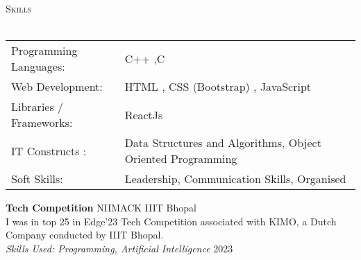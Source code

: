 \documentclass[a4paper]{article}
\newcommand{\lineunder} {
    \vspace*{-8pt} \\
    \hspace*{-18pt} \hrulefill \\
}
\newcommand{\header} [1] {
    {\hspace*{-18pt}\vspace*{6pt} \textsc{#1}}
    \vspace*{-6pt} \lineunder
}
\begin{document}


\header{Skills}
\vspace{2mm}
\begin{tabular}{ l l }
	Programming Languages: &  C++ ,C\\
	Web Development:       & HTML , CSS (Bootstrap) , JavaScript   \\
	Libraries / Frameworks: & ReactJs        \\
IT Constructs :           &  Data Structures and Algorithms, Object Oriented Programming  \\
	Soft Skills:           &  Leadership, Communication Skills, Organised  \\
	
\end{tabular}



\textbf{Tech Competition} \hfill NIIMACK IIIT Bhopal\\
I was in top 25 in Edge'23 Tech Competition associated with KIMO, a Dutch Company conducted by IIIT Bhopal.\\
{\textit {Skills Used: Programming, Artificial Intelligence}}  \hfill 2023\\

\end{document}
